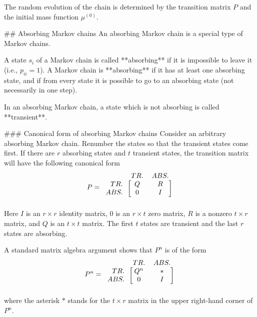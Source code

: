 The random evolution of the chain is determined by the transition matrix $P$ and the initial mass function $\mu^{(0)}$.


## Absorbing Markov chains
An absorbing Markov chain is a special type of Markov chains.

\begin{definition}
A state $s_i$ of a Markov chain is called **absorbing** if it is impossible to leave it (i.e., $p_{ii} = 1$). A Markov chain is **absorbing** if it has at least one absorbing state, and if from every state it is possible to go to an absorbing state (not necessarily in one step).
\end{definition}

\begin{definition}
In an absorbing Markov chain, a state which is not absorbing is called **transient**.
\end{definition}

### Canonical form of absorbing Markov chains
Consider an arbitrary absorbing Markov chain. Renumber the states so that the transient states come first. If there are $r$ absorbing states and $t$ transient states, the transition matrix will have the following canonical form
\begin{equation*}
    P = 
    \begin{blockarray}{rcc}
        & TR. & ABS. \\
    \begin{block}{r[cc]}
        TR. & Q &  R \\
        ABS. & 0 &  I \\
    \end{block}
    \end{blockarray}
\end{equation*}
Here $I$ is an $r\times r$ identity matrix, $0$ is an $r\times t$ zero matrix, $R$ is a nonzero $t\times r$ matrix, and $Q$ is an $t\times t$ matrix. The first $t$ states are transient and the last $r$ states are absorbing.

A standard matrix algebra argument shows that $P^n$ is of the form
\begin{equation*}
    P^n = 
    \begin{blockarray}{rcc}
        & TR. & ABS. \\
    \begin{block}{r[cc]}
        TR. & Q^n &  * \\
        ABS. & 0 &  I \\
    \end{block}
    \end{blockarray}
\end{equation*}
where the asterisk $*$ stands for the $t\times r$ matrix in the upper right-hand corner of $P^n$. 

